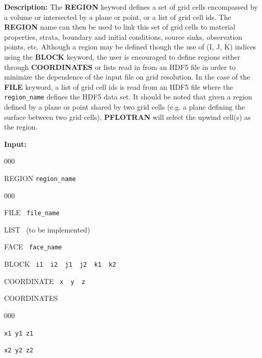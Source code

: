 \hfill\hyperlink{target_key}{\return}

{\noindent\bf Description:}
The {\bf REGION} keyword defines a set of grid cells encompassed by a volume or intersected by a plane or point, or a list of grid cell ids.  The {\bf REGION} name can then be used to link this set of grid cells to material properties, strata, boundary and initial conditions, source sinks, observation points, etc.  Although a region may be defined though the use of (I, J, K) indices using the {\bf BLOCK} keyword, the user is encouraged to define regions either through {\bf COORDINATES} or lists read in from an HDF5 file in order to minimize the dependence of the input file on grid resolution.  In the case of the {\bf FILE} keyword, a list of grid cell ids is read from an HDF5 file where the {\tt region\_name} defines the HDF5 data set.  It should be noted that given a region defined by a plane or point shared by two grid cells (e.g. a plane defining the surface between two grid cells), {\bf PFLOTRAN} will select the upwind cell(s) as the region.

{\noindent\bf Input:}

\begin{deflist}{000}
\item[REGION] {\tt region\_name}
\begin{deflist}{000}
\item[FILE] \ {\tt file\_name}
\item[LIST] \ (to be implemented)
\item[FACE] \ {\tt face\_name}
\item[BLOCK] \ {\tt i1 \ i2 \ j1 \ j2 \ k1 \ k2}
\item[COORDINATE] \ {\tt x \ y \ z}
\item[COORDINATES] ~
\begin{deflist}{000}
\item[\tt x1 y1 z1]
\item[\tt x2 y2 z2]
\end{deflist}
\item[\keyend]
\end{deflist}
\item[\keyend]
\end{deflist}


